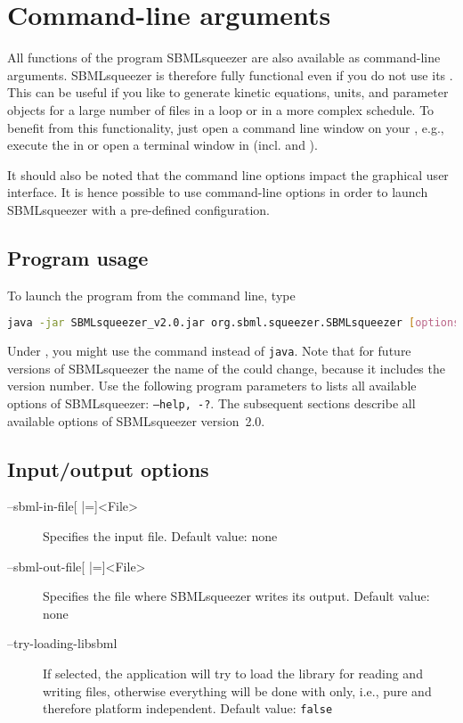  

\chapter{Command-line arguments}
\label{chap:CMD}
\renewcommand{\descriptionlabel}[1]{\textcolor{blue}{\texttt{#1}}}

All functions of the program SBMLsqueezer are also available as command-line
arguments. SBMLsqueezer is therefore fully functional even if you do not use
its \GUI.
This can be useful if you like to generate kinetic equations, units, and
parameter objects for a large number of \SBML files in a loop or in a more
complex schedule.
To benefit from this functionality, just open a command line window on your
\OS, e.g., execute the  in \Windows or open a terminal window
in \Unix (incl. \Linux and \MacOSX).

It should also be noted that the command line options impact the graphical user
interface. It is hence possible to use command-line options in order to launch
SBMLsqueezer with a pre-defined configuration.

\section{Program usage}
\label{sec:Program_usage}
To launch the program from the command line, type
\begin{lstlisting}[language=bash,numbers=none]
java -jar SBMLsqueezer_v2.0.jar org.sbml.squeezer.SBMLsqueezer [options]
\end{lstlisting}
Under \Windows, you might use the command  instead of
\texttt{java}. Note that for future versions of SBMLsqueezer the name of the
\JAR could change, because it includes the version number.
Use the following program parameters to lists all available options of
SBMLsqueezer: \texttt{--help, -?}.
The subsequent sections describe all available options of SBMLsqueezer
version~2.0. 

\section{Input/output options}
\label{sec:IO_options}
\begin{description}
\item[--sbml-in-file{[} |={]}<File>]
  Specifies the \SBML input file.
  Default value: none

\item[--sbml-out-file{[} |={]}<File>]
  Specifies the file where SBMLsqueezer writes its \SBML output.
  Default value: none

\item[--try-loading-libsbml]
  If selected, the application will try to load the library \libSBML
  for reading and writing \SBML files, otherwise everything will
  be done with \JSBML only, i.e., pure \Java and therefore platform independent.
  Default value: \texttt{false}
\end{description}

